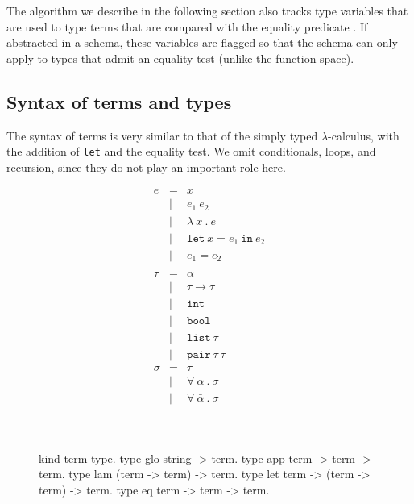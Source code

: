 \documentclass{these-ISSS}
\newenvironment{elpicode}
  {\VerbatimEnvironment\begin{elpibox}\begin{xelpicode}}{\end{xelpicode}
\end{elpibox}}
\begin{document}
The algorithm we describe in the following section also tracks
type variables that are used to type terms that are compared with
the equality predicate \ocaml{(=)}. If abstracted in a schema, these
variables are flagged so that the schema can only apply to types
that admit an equality test (unlike the function space).

\subsection{Syntax of terms and types}

The syntax of terms is very similar to that of the simply typed
$\lambda$-calculus, with the addition of \texttt{let} and the equality test.
We omit conditionals, loops, and recursion, since they do not play an
important role here.
\begin{figure}[!h]
\begin{center}
\begin{minipage}{0.35\textwidth}
$$
\begin{array}{lrl}
  e & =     & x                                 \\
  & \vert & e_1\ e_2                            \\
  & \vert & \lambda\ x\ .\ e                    \\
  & \vert & \mathtt{let}\ x = e_1\ \mathtt{in}\ e_2 \\
  & \vert & e_1 = e_2 \\
  \\
    \tau   &=     & \alpha                    \\
                              &\vert &  \tau \to \tau         \\
                              &\vert &  \mathtt{int}         \\
                              &\vert &  \mathtt{bool}         \\
                              &\vert &  \mathtt{list}\ \tau         \\
                              &\vert &  \mathtt{pair}\ \tau\ \tau         \\
  
     \sigma &=    & \tau                                           \\
                             &\vert& \forall\ \alpha\ .\ \sigma \\
                            &\vert& \forall\ \bar\alpha\ .\ \sigma \\
\end{array}
$$
\end{minipage}~~
\begin{minipage}{0.64\textwidth}
\vspace{0.6em}
\begin{elpicode}
kind term   type.
type glo    string -> term.
type app    term -> term -> term.
type lam    (term -> term) -> term.
type let    term -> (term -> term) -> term.
type eq     term -> term -> term.


\end{elpicode}
\end{minipage}
\end{center}
\end{figure}
\end{document}
